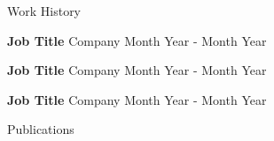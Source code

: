 \documentclass{resume} %
\begin{document}
	
	\begin{rSection}{Work History}
		\vspace{-1.25em}
		\item \textbf{Job Title} {Company} \hfill Month Year - Month Year
		\item \textbf{Job Title} {Company} \hfill Month Year - Month Year
		\item \textbf{Job Title} {Company} \hfill Month Year - Month Year
	\end{rSection} 
	
	\begin{rSection}{Publications}
		\nocite{*} %
		
		
	\end{rSection}

	
	
\end{document}
